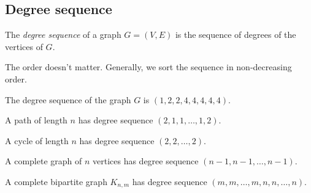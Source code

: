 \documentclass{classnotes}
\begin{document}
\subsection{Degree sequence}
\begin{definition}
    The \emph{degree sequence} of a graph $G=(V,E)$ is the sequence of degrees of the vertices of $G$.

    The order doesn't matter. Generally, we sort the sequence in non-decreasing order.
\end{definition}
\begin{example}
    The degree sequence of the graph $G$ is $(1,2,2,4,4,4,4,4)$.
    \begin{center}
    \end{center}
\end{example}
\begin{example}
    A path of length $n$ has degree sequence $(2,1,1,\dots,1,2)$.
\end{example}
\begin{example}
    A cycle of length $n$ has degree sequence $(2,2,\dots,2)$.
\end{example}
\begin{example}
    A complete graph of $n$ vertices has degree sequence $(n-1,n-1,\dots,n-1)$.
\end{example}
\begin{example}
    A complete bipartite graph $K_{n,m}$ has degree sequence $(m,m,\dots,m,n,n,\dots,n)$.
\end{example}
\end{document}
